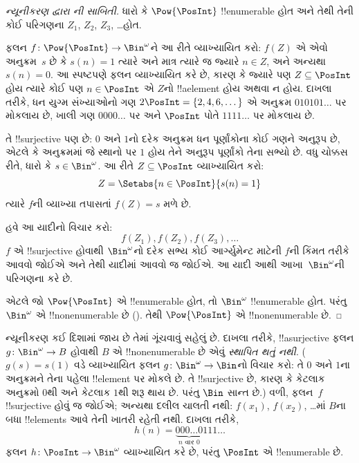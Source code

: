 \documentclass[../../../include/open-logic-section]{subfiles}
\begin{document}
\begin{proof}[ન્યૂનીકરણ દ્વારા {}ની સાબિતી]
ધારો કે $\Pow{\PosInt}$ !!{enumerable} હોત અને તેથી તેની કોઈ
પરિગણના $Z_{1}$, $Z_{2}$, $Z_{3}$, \dots હોત.

ફલન $f \colon \Pow{\PosInt} \to \Bin^\omega$ને આ રીતે
વ્યાખ્યાયિત કરો: $f(Z)$ એ એવો અનુક્રમ~$s$ છે કે
$s(n) = 1$ ત્યારે અને માત્ર ત્યારે જ જ્યારે $n \in Z$, અને
અન્યથા $s(n) = 0$. આ સ્પષ્ટપણે ફલન વ્યાખ્યાયિત કરે છે,
કારણ કે જ્યારે પણ $Z \subseteq \PosInt$ હોય ત્યારે કોઈ પણ
$n \in \PosInt$ એ $Z$નો !!a{element} હોય અથવા ન હોય.
દાખલા તરીકે, ધન યુગ્મ સંખ્યાઓનો ગણ $2\PosInt = \{2,
4, 6, \dots\}$ એ અનુક્રમ $010101\dots$ પર મોકલાય છે,
ખાલી ગણ $0000\dots$ પર અને $\PosInt$ પોતે $1111\dots$ પર મોકલાય છે.

તે !!{surjective} પણ છે: $0$ અને $1$નો દરેક અનુક્રમ ધન
પૂર્ણાંકોના કોઈ ગણને અનુરૂપ છે, એટલે કે અનુક્રમમાં જે સ્થાનો પર
$1$ હોય તેને અનુરૂપ પૂર્ણાંકો તેના સભ્યો છે. વધુ ચોક્કસ રીતે,
ધારો કે $s \in \Bin^\omega$. આ રીતે $Z \subseteq \PosInt$
વ્યાખ્યાયિત કરો:
\[
Z = \Setabs{n \in \PosInt}{s(n) = 1}
\]
ત્યારે $f$ની વ્યાખ્યા તપાસતાં $f(Z) = s$ મળે છે.

હવે આ યાદીનો વિચાર કરો:
\[
f(Z_1), f(Z_2), f(Z_3), \dots
\]
$f$ એ !!{surjective} હોવાથી $\Bin^\omega$નો દરેક સભ્ય કોઈ
આર્ગ્યુમેન્ટ માટેની $f$ની કિંમત તરીકે આવવો જોઈએ અને તેથી યાદીમાં આવવો જ
જોઈએ. આ યાદી આથી આખા~$\Bin^\omega$ની પરિગણના કરે છે.

એટલે જો $\Pow{\PosInt}$ એ !!{enumerable} હોત, તો $\Bin^\omega$
!!{enumerable} હોત. પરંતુ $\Bin^\omega$ એ !!{nonenumerable} છે
(). તેથી $\Pow{\PosInt}$ એ
!!{nonenumerable} છે.
\end{proof}

\begin{explain}
ન્યૂનીકરણ કઈ દિશામાં જાય છે તેમાં ગૂંચવાવું સહેલું છે.
દાખલા તરીકે, !!a{surjective} ફલન $g \colon \Bin^\omega \to B$
હોવાથી $B$ એ !!{nonenumerable} છે એવું \emph{સ્થાપિત થતું નથી}.
($g(s) = s(1)$ વડે વ્યાખ્યાયિત ફલન
$g \colon \Bin^\omega \to \Bin$નો વિચાર કરો: તે $0$ અને $1$ના
અનુક્રમને તેના પહેલા !!{element} પર મોકલે છે. તે !!{surjective} છે,
કારણ કે કેટલાક અનુક્રમો $0$થી અને કેટલાક $1$થી શરૂ થાય છે.
પરંતુ $\Bin$ સાન્ત છે.) વળી, ફલન~$f$ !!{surjective} હોવું જ
જોઈએ; અન્યથા દલીલ ચાલતી નથી: $f(x_1)$, $f(x_2)$, \dots{}માં
$B$ના બધા !!{element}s આવે તેની ખાતરી રહેતી નથી. દાખલા તરીકે,
\[
h(n) = \underbrace{000\dots0}_{\text{$n$ વાર $0$}}111\dots
\]
ફલન $h\colon \PosInt \to \Bin^\omega$ વ્યાખ્યાયિત કરે છે,
પરંતુ $\PosInt$ એ !!{enumerable} છે.
\end{explain}
\end{document}
